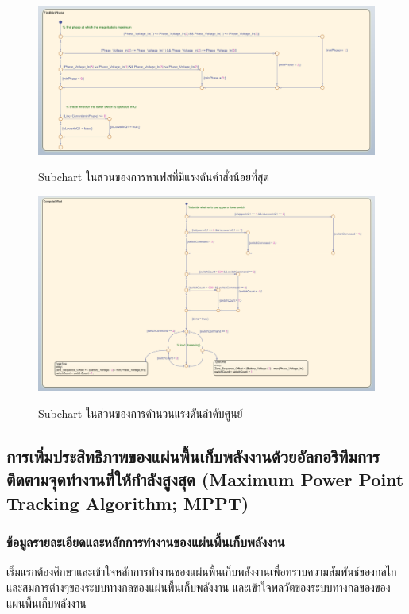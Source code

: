 \documentclass[11pt,a4paper]{article}
\begin{document}
\begin{figure}
    \centering
    \includegraphics[width=\textwidth]{tam-fqt-l2-2.png}
    \label{tam-fqt-l2-2}
    \caption{Subchart ในส่วนของการหาเฟสที่มีแรงดันคำสั่งน้อยที่สุด}
\end{figure}

\begin{figure}
    \centering
    \includegraphics[width=\textwidth]{tam-fqt-l2-3.png}
    \label{tam-fqt-l2-3}
    \caption{Subchart ในส่วนของการคำนวนแรงดันลำดับศูนย์}
\end{figure}

\newpage
\subsection{การเพิ่มประสิทธิภาพของแผ่นพื้นเก็บพลังงานด้วยอัลกอริทึมการติดตามจุดทำงานที่ให้กำลังสูงสุด (Maximum Power Point Tracking Algorithm; MPPT)}
\subsubsection{ข้อมูลรายละเอียดและหลักการทำงานของแผ่นพื้นเก็บพลังงาน}
เริ่มแรกต้องศึกษาและเข้าใจหลักการทำงานของแผ่นพื้นเก็บพลังงานเพื่อทราบความสัมพันธ์ของกลไกและสมการต่างๆของระบบทางกลของแผ่นพื้นเก็บพลังงาน \cite{GpH:01}
และเข้าใจพลวัตของระบบทางกลของของแผ่นพื้นเก็บพลังงาน
\end{document}
